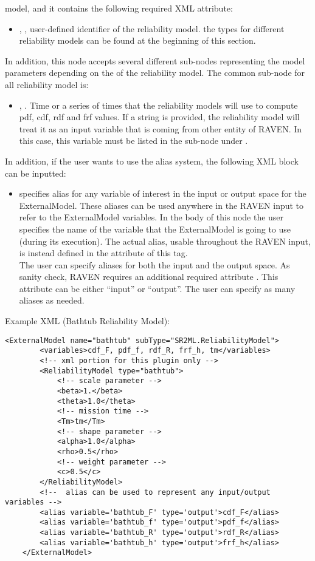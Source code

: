 \begin{itemize}
	model, and it contains the following required XML attribute:
	\begin{itemize}
		\item {}, , user-defined identifier of the reliability model.
		\nb the types for different reliability models can be found at the beginning of this section.
	\end{itemize}
	In addition, this node accepts several different sub-nodes representing the model parameters depending on the
	 of the reliability model. The common sub-node for all reliability model is:
	\begin{itemize}
		\item {}, . Time or a series
		of times that the reliability models will use to compute pdf, cdf, rdf and frf values. If a string is provided,
		the reliability model will treat it as an input variable that is coming from other entity of RAVEN. In this
		case, this variable must be listed in the sub-node  under .
	\end{itemize}
\end{itemize}
In addition, if the user wants to use the alias system, the following XML block can be inputted:
\begin{itemize}
	\item {}  specifies alias for
	any variable of interest in the input or output space for the ExternalModel.
	These aliases can be used anywhere in the RAVEN input to refer to the ExternalModel
	variables.
	In the body of this node the user specifies the name of the variable that the ExternalModel is
	going to use (during its execution).
	The actual alias, usable throughout the RAVEN input, is instead defined in the
	 attribute of this tag.
	\\The user can specify aliases for both the input and the output space. As sanity check, RAVEN
	requires an additional required attribute . This attribute can be either ``input'' or ``output''.
	\nb The user can specify as many aliases as needed.
\end{itemize}

Example XML (Bathtub Reliability Model):
\begin{lstlisting}[style=XML]
	<ExternalModel name="bathtub" subType="SR2ML.ReliabilityModel">
		<variables>cdf_F, pdf_f, rdf_R, frf_h, tm</variables>
		<!-- xml portion for this plugin only -->
		<ReliabilityModel type="bathtub">
			<!-- scale parameter -->
			<beta>1.</beta>
			<theta>1.0</theta>
			<!-- mission time -->
			<Tm>tm</Tm>
			<!-- shape parameter -->
			<alpha>1.0</alpha>
			<rho>0.5</rho>
			<!-- weight parameter -->
			<c>0.5</c>
		</ReliabilityModel>
		<!--  alias can be used to represent any input/output variables -->
		<alias variable='bathtub_F' type='output'>cdf_F</alias>
		<alias variable='bathtub_f' type='output'>pdf_f</alias>
		<alias variable='bathtub_R' type='output'>rdf_R</alias>
		<alias variable='bathtub_h' type='output'>frf_h</alias>
	</ExternalModel>
\end{lstlisting}

